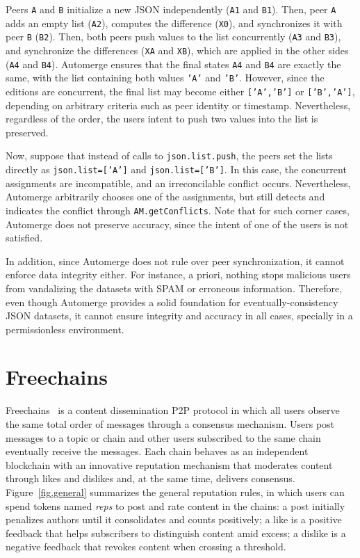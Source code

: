\documentclass[12pt]{article}
\newcommand{\code}[1]  {\texttt{\footnotesize{#1}}}
\begin{document}
Peers \code{A} and \code{B} initialize a new JSON independently (\code{A1} and
\code{B1}).
Then, peer \code{A} adds an empty list (\code{A2}), computes the difference
(\code{X0}), and synchronizes it with peer \code{B} (\code{B2}).
Then, both peers push values to the list concurrently (\code{A3} and
\code{B3}), and synchronize the differences (\code{XA} and \code{XB}), which
are applied in the other sides (\code{A4} and \code{B4}).
Automerge ensures that the final states \code{A4} and \code{B4} are exactly the
same, with the list containing both values \code{'A'} and \code{'B'}.
However, since the editions are concurrent, the final list may become either
\code{['A','B']} or \code{['B','A']}, depending on arbitrary criteria such as
peer identity or timestamp.
Nevertheless, regardless of the order, the users intent to push two values into
the list is preserved.

Now, suppose that instead of calls to \code{json.list.push}, the peers set the
lists directly as \code{json.list=['A']} and \code{json.list=['B']}.
In this case, the concurrent assignments are incompatible, and an
irreconcilable conflict occurs.
Nevertheless, Automerge arbitrarily chooses one of the assignments, but still
detects and indicates the conflict through \code{AM.getConflicts}.
Note that for such corner cases, Automerge does not preserve accuracy, since
the intent of one of the users is not satisfied.

In addition, since Automerge does not rule over peer synchronization, it cannot
enforce data integrity either.
For instance, a priori, nothing stops malicious users from vandalizing the
datasets with SPAM or erroneous information.
%
Therefore, even though Automerge provides a solid foundation for
eventually-consistency JSON datasets, it cannot ensure integrity and accuracy
in all cases, specially in a permissionless environment.

\section{Freechains}
\label{sec.freechains}

Freechains~\cite{fcs.sbseg20} is a content dissemination P2P protocol in which
all users observe the same total order of messages through a consensus
mechanism.
%
Users post messages to a topic or chain and other users subscribed to the same
chain eventually receive the messages.
%
Each chain behaves as an independent blockchain with an innovative reputation
mechanism that moderates content through likes and dislikes and, at the same
time, delivers consensus.
%
Figure~\ref{fig.general} summarizes the general reputation rules, in which
users can spend tokens named \emph{reps} to post and rate content in the
chains:
    a post initially penalizes authors until it consolidates and counts positively;
    a like is a positive feedback that helps subscribers to distinguish content amid excess;
    a dislike is a negative feedback that revokes content when crossing a threshold.
\end{document}
